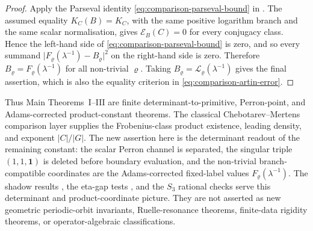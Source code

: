 \documentclass[11pt,a4paper]{amsart}
\theoremstyle{plain}
\theoremstyle{definition}
\theoremstyle{remark}
\newcommand{\abs}[1]{\lvert #1 \rvert}
\begin{document}
\begin{proof}
  Apply the Parseval identity \eqref{eq:comparison-parseval-bound} in
  .  The assumed equality
  \(K_C(B)=K_C\), with the same positive logarithm branch and the same scalar
  normalisation, gives \(\mathscr E_B(C)=0\) for every conjugacy class.  Hence
  the left-hand side of \eqref{eq:comparison-parseval-bound} is zero, and so
  every summand
  \(\abs{F_\varrho(\lambda^{-1})-B_\varrho}^2\) on the right-hand side is zero.
  Therefore \(B_\varrho=F_\varrho(\lambda^{-1})\) for all non-trivial
  \(\varrho\).  Taking
  \(B_\varrho=\mathcal L_\varrho(\lambda^{-1})\) gives the final assertion,
  which is also the equality criterion in \eqref{eq:comparison-artin-error}.
\end{proof}

Thus Main Theorems~I--III are finite determinant-to-primitive,
Perron-point, and Adams-corrected product-constant theorems.  The classical
Chebotarev--Mertens comparison layer supplies the Frobenius-class product
existence, leading density, and exponent \(|C|/|G|\).  The new assertion here
is the determinant readout of the remaining constant: the scalar Perron channel
is separated, the singular triple \((1,1,\mathbf1)\) is deleted before boundary
evaluation, and the non-trivial branch-compatible coordinates are the
Adams-corrected fixed-label values \(F_\varrho(\lambda^{-1})\).  The shadow
results
, the eta-gap tests
, and the \(S_3\) rational checks
serve this determinant and product-coordinate picture.  They are not asserted
as new geometric periodic-orbit invariants, Ruelle-resonance theorems,
finite-data rigidity theorems, or operator-algebraic classifications.
\end{document}
